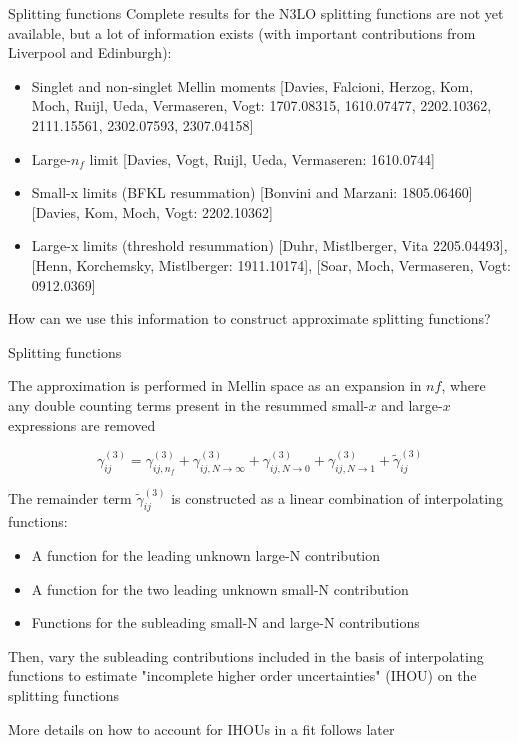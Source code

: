 \documentclass[aspectratio=169, 9pt,t]{beamer}
\begin{document}
\begin{frame}{Splitting functions}
  Complete results for the N3LO splitting functions are not yet available, but a lot of information exists (with important contributions from Liverpool and Edinburgh):
  \begin{itemize}
    \item Singlet and non-singlet Mellin moments
    {\color{gray}\small [Davies, Falcioni, Herzog, Kom, Moch, Ruijl, Ueda, Vermaseren, Vogt: 1707.08315, 1610.07477, 2202.10362, 2111.15561, 2302.07593, 2307.04158]}
    \item Large-$n_f$ limit {\color{gray}\small [Davies, Vogt, Ruijl, Ueda, Vermaseren: 1610.0744]}
    \item Small-x limits (BFKL resummation) {\color{gray}\small [Bonvini and Marzani: 1805.06460] [Davies, Kom, Moch, Vogt: 2202.10362]}
    \item Large-x limits (threshold resummation) {\color{gray}\small [Duhr, Mistlberger, Vita 2205.04493], [Henn, Korchemsky, Mistlberger: 1911.10174], [Soar, Moch, Vermaseren, Vogt: 0912.0369]}
  \end{itemize}

  \vspace*{2em}
  \begin{center}
    How can we use this information to construct approximate splitting functions?
  \end{center}

\end{frame}


\begin{frame}{Splitting functions}

  The approximation is performed in Mellin space as an expansion in $nf$, where any double counting terms present in the resummed small-$x$ and large-$x$ expressions are removed

  $$\gamma_{i j}^{(3)}=\gamma_{i j, n_f}^{(3)}+\gamma_{i j, N \rightarrow \infty}^{(3)}+\gamma_{i j, N \rightarrow 0}^{(3)}+\gamma_{i j, N \rightarrow 1}^{(3)}+\widetilde{\gamma}_{i j}^{(3)}$$

  \vspace*{1em}
  The remainder term $\widetilde{\gamma}_{i j}^{(3)}$ is constructed as a linear combination of interpolating functions:
  \begin{itemize}
    \item A function for the leading unknown large-N contribution
    \item A function for the two leading unknown small-N contribution
    \item Functions for the subleading small-N and large-N contributions
  \end{itemize}

  \vspace*{0.5em}
  Then, vary the subleading contributions included in the basis of interpolating functions to estimate "incomplete higher order uncertainties" (IHOU) on the splitting functions

  \vspace*{1em}
  More details on how to account for IHOUs in a fit follows later
\end{frame}
\end{document}

